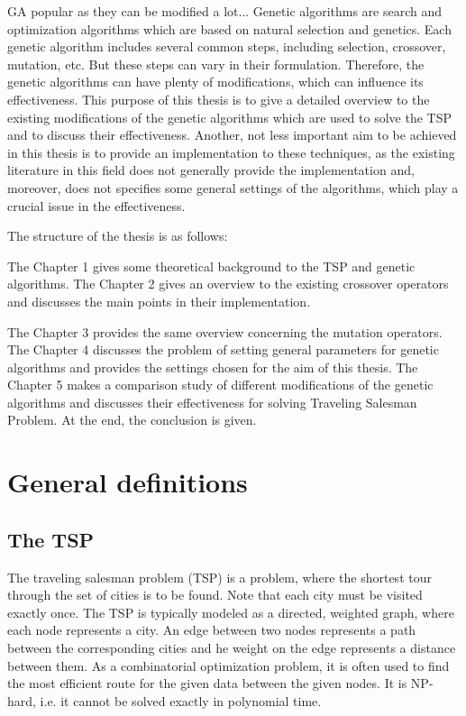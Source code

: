\documentclass[a4paper, 12pt, headings=standardclasses]{scrartcl}
\begin{document}
	 GA popular as they can be modified a lot...
	 Genetic algorithms are search and optimization algorithms which are based on natural selection and genetics. Each genetic algorithm includes several common steps, including selection, crossover, mutation, etc. But these steps can vary in their formulation. Therefore, the genetic algorithms can have plenty of modifications, which can influence its effectiveness. This purpose of this thesis is to give a detailed overview to the existing modifications of the genetic algorithms which are used to solve the TSP and to discuss their effectiveness. Another, not less important aim to be achieved in this thesis is to provide an implementation to these techniques, as the existing literature in this field does not generally provide the implementation and, moreover, does not specifies some general settings of the algorithms, which play a crucial issue in the effectiveness. \par
	 The structure of the thesis is as follows:\par
	 The Chapter 1 gives some theoretical background to the TSP and genetic algorithms. The Chapter 2 gives an overview to the existing crossover operators and discusses the main points in their implementation. \par The Chapter 3 provides the same overview concerning the mutation operators. The Chapter 4 discusses the problem of setting general parameters for genetic algorithms and provides the settings chosen for the aim of this thesis. The Chapter 5 makes a comparison study of different modifications of the genetic algorithms and discusses their effectiveness for solving Traveling Salesman Problem. At the end, the conclusion is given.
\section{General definitions}
\subsection{The TSP}
The traveling salesman problem (TSP) is a problem, where the shortest tour through the set of cities is to be found. Note that each city must be visited exactly once. The TSP is typically modeled as a directed, weighted graph, where each node represents a city. An edge between two nodes represents a path between the corresponding cities and he weight on the edge represents a distance between them. As a combinatorial optimization problem, it is often used to find the most efficient route for the given data between the given nodes. It is NP-hard, i.e. it cannot be solved exactly in polynomial time. \par
\end{document}
